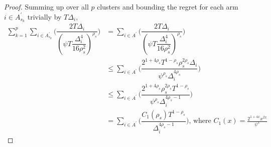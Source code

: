 \begin{proof}
 
Summing up over all $p$ clusters and bounding the regret for each arm $i\in A_{s_{k}}^{'} $ trivially by $T\Delta_{i}$,
 \begin{align*}
 \sum_{k=1}^{p}\sum_{i\in A_{s_{k}}^{'}}\bigg(\dfrac{2T\Delta_{i}}{(\psi T\dfrac{\Delta_{i}^{4}}{16\rho_{s}^{2}})^{\rho_{s}}}\bigg) &= \sum_{i\in A^{'}}\bigg(\dfrac{2T\Delta_{i}}{(\psi  T\dfrac{\Delta_{i}^{4}}{16\rho_{s}^{2}})^{\rho_{s}}}\bigg) \\
 &\leq \sum_{i\in A^{'}}\bigg(\dfrac{2^{1+4\rho_{s}}T^{1-\rho_{s}}\rho_{s}^{2\rho_{s}}\Delta_{i}}{\psi^{\rho_{s}}\Delta_{i}^{4\rho_{s}}}\bigg)\\
 &\leq \sum_{i\in A^{'}}\bigg(\dfrac{2^{1+4\rho_{s}}\rho_{s}^{2\rho_{s}}T^{1-\rho_{s}}}{\psi^{\rho_{s}}\Delta_{i}^{4\rho_{s}-1}}\bigg)\\
 &= \sum_{i\in A^{'}}\bigg(\dfrac{C_{1}(\rho_{s})T^{1-\rho_{s}}}{\Delta_{i}^{4\rho_{s}-1}}\bigg) \text{, where } C_1(x) = \frac{2^{1+4x}x^{2x}}{\psi^{x}}
 \end{align*}
 


\end{proof}
